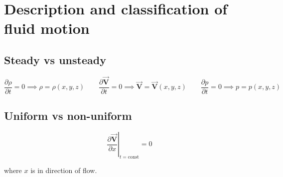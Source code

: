 \documentclass[12pt]{report}
\theoremstyle{remark}
\let\oldvec = \vec
\renewcommand{\vec}[1]{\oldvec{\mathbf{#1}}}
\begin{document}
\section{Description and classification of fluid motion}%
\label{sec:Description and classification of fluid motion}

\subsection{Steady vs unsteady}%
\label{sub:Steady vs unsteady}

\begin{equation*}
    \frac{\partial \rho}{\partial t} = 0 \implies \rho = \rho(x, y, z) \qquad
    \frac{\partial \vec{V}}{\partial t} = 0 \implies \vec{V} = \vec{V}(x, y, z) \qquad
    \frac{\partial p}{\partial t} = 0 \implies p = p(x, y, z)
\end{equation*}

\subsection{Uniform vs non-uniform}%
\label{sub:Uniform vs non-uniform}

\begin{equation*}
    \left.\frac{\partial \vec{V}}{\partial x} \right\rvert_{t = \text{const}} = 0
\end{equation*}

where $ x $ is in direction of flow. 
\end{document}
